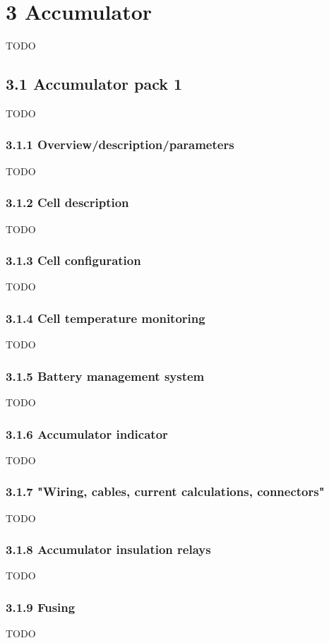 \documentclass{article}
\begin{document}
\section*{3 Accumulator}
TODO

\subsection*{3.1 Accumulator pack 1}
TODO

\subsubsection*{3.1.1 Overview/description/parameters}
TODO

\subsubsection*{3.1.2 Cell description}
TODO

\subsubsection*{3.1.3 Cell configuration}
TODO

\subsubsection*{3.1.4 Cell temperature monitoring}
TODO

\subsubsection*{3.1.5 Battery management system}
TODO

\subsubsection*{3.1.6 Accumulator indicator}
TODO

\subsubsection*{3.1.7 "Wiring, cables, current calculations, connectors"}
TODO

\subsubsection*{3.1.8 Accumulator insulation relays}
TODO

\subsubsection*{3.1.9 Fusing}
TODO
\end{document}
